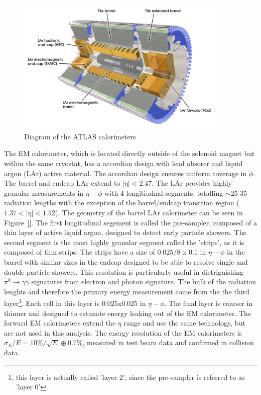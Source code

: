 \begin{figure}[!t]
\centering 
\includegraphics[width=0.9\textwidth]{figs/lhc/Calorimeter-eps-converted-to}
\caption{Diagram of the ATLAS calorimeters}
\label{figure:lhc_calo}
\end{figure}


The EM calorimeter, which is located directly outside of the solenoid magnet but within the same cryostat, has a accordian design with lead absorer and liquid argon (LAr) active material. The accordian design ensures uniform coverage in $\phi$. The barrel and endcap LAr extend to $|\eta| < 2.47$. The LAr provides highly granular measurements in $\eta-\phi$ with 4 longitiudnal segments, totalling $\sim$25-35 radiation lengths with the exception of the barrel/endcap transition region ($1.37<|\eta|<1.52$).  The geometry of the barrel LAr calorimeter can be seen in Figure~\ref{}. The first longitudinal segement is called the pre-sampler, composed of a thin layer of active liquid argon, designed to detect early particle showers. The second segment is the most highly granular segment called the 'strips', as it is composed of thin strips. The strips have a size of $0.025/8$ x $0.1$ in $\eta-\phi$ in the barrel with similar sizes in the endcap designed to be able to resolve single and double particle showers. This resolution is particularly useful in distriguishing $\pi^0\rightarrow\gamma\gamma$ signatures from electron and photon signature. The bulk of the radiation lenghts and therefore the primary energy measurement come from the the third layer\footnote{this layer is actually called 'layer 2', since the pre-sampler is referred to as 'layer 0'}. Each cell in this layer is $0.025$x$0.025$ in $\eta-\phi$. The final layer is coarser in thinner and designed to estimate energy leaking out of the EM calorimeter. The forward EM calorimeters extend the $\eta$ range and use the same technology, but are not used in this analysis. The energy resolution of the EM calorimeters is $\sigma_E/E = 10\%/\sqrt{E}\oplus0.7\%$, measured in test beam data and confirmed in collision data. 

